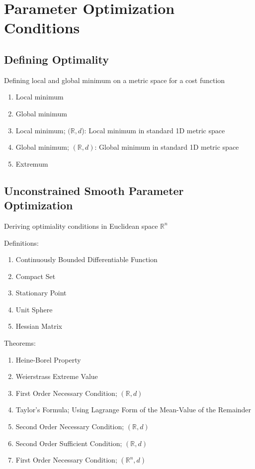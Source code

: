 \section{Parameter Optimization Conditions}

\subsection{Defining Optimality}

\begin{summary}

Defining local and global minimum on a metric space for a cost function

\begin{enumerate}
    \item Local minimum
    \item Global minimum
    \item Local minimum; $(\mathbb{R},d$): Local minimum in standard 1D metric space
    \item Global minimum; $(\mathbb{R},d)$: Global minimum in standard 1D metric space
    \item Extremum
\end{enumerate}

\end{summary}

\subsection{Unconstrained Smooth Parameter Optimization}

\begin{summary}

Deriving optimiality conditions in Euclidean space $\mathbb{R}^n$

Definitions:
\begin{enumerate}
    \item Continuously Bounded Differentiable Function
    \item Compact Set
    \item Stationary Point
    \item Unit Sphere
    \item Hessian Matrix
\end{enumerate}

Theorems:
\begin{enumerate}
    \item Heine-Borel Property
    \item Weierstrass Extreme Value
    \item First Order Necessary Condition; $(\mathbb{R},d)$
    \item Taylor's Formula; Using Lagrange Form of the Mean-Value of the Remainder
    \item Second Order Necessary Condition; $(\mathbb{R},d)$
    \item Second Order Sufficient Condition; $(\mathbb{R},d)$
    \item First Order Necessary Condition; $(\mathbb{R}^n,d)$
\end{enumerate}

\end{summary}